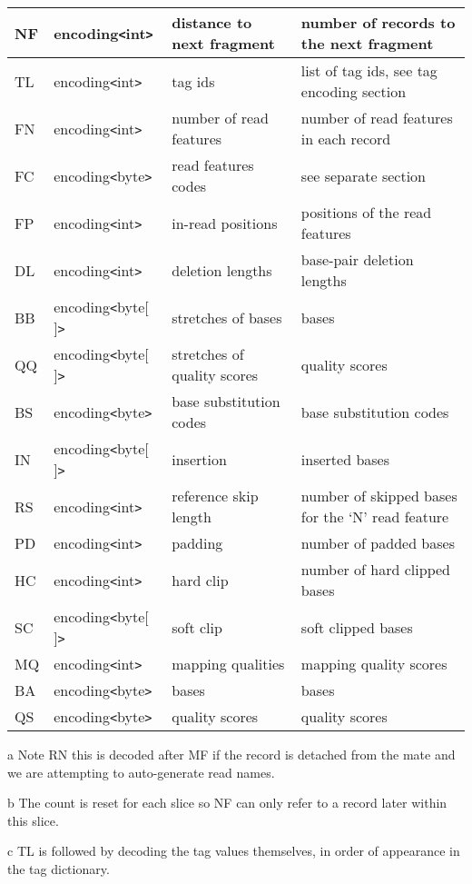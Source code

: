 \documentclass[a4paper]{article}
\begin{document}
\begin{threeparttable}[t]
\begin{tabular}{|l|l|>{\raggedright}p{100pt}|>{\raggedright}p{220pt}|}
\hline
NF & encoding\texttt{<}int\texttt{>} & distance to next fragment & number of records
to the next fragment\tnote{b}\tabularnewline
\hline
TL\tnote{c} & encoding\texttt{<}int\texttt{>} & tag ids  & list of tag ids, see tag encoding
section\tabularnewline
\hline
FN & encoding\texttt{<}int\texttt{>} & number of read features & number of read
features in each record\tabularnewline
\hline
FC & encoding\texttt{<}byte\texttt{>} & read features codes & see separate section\tabularnewline
\hline
FP & encoding\texttt{<}int\texttt{>} & in-read positions & positions of the read
features\tabularnewline
\hline
DL & encoding\texttt{<}int\texttt{>} & deletion lengths & base-pair deletion lengths\tabularnewline
\hline
BB & encoding\texttt{<}byte[ ]\texttt{>} & stretches of bases & bases\tabularnewline
\hline
QQ & encoding\texttt{<}byte[ ]\texttt{>} & stretches of quality scores & quality scores\tabularnewline
\hline
BS & encoding\texttt{<}byte\texttt{>} & base substitution codes & base substitution
codes\tabularnewline
\hline
IN & encoding\texttt{<}byte[ ]\texttt{>} & insertion & inserted bases\tabularnewline
\hline
RS & encoding\texttt{<}int\texttt{>} & reference skip length & number of skipped 
bases for the `N' read feature\tabularnewline
\hline
PD & encoding\texttt{<}int\texttt{>} & padding & number of padded bases\tabularnewline
\hline
HC & encoding\texttt{<}int\texttt{>} & hard clip & number of hard clipped bases\tabularnewline
\hline
SC & encoding\texttt{<}byte[ ]\texttt{>} & soft clip & soft clipped bases\tabularnewline
\hline
MQ & encoding\texttt{<}int\texttt{>} & mapping qualities & mapping quality scores\tabularnewline
\hline
BA & encoding\texttt{<}byte\texttt{>} & bases & bases\tabularnewline
\hline
QS & encoding\texttt{<}byte\texttt{>} & quality scores & quality scores\tabularnewline
\hline
\end{tabular}

\begin{tablenotes}
\item[a] Note RN this is decoded after MF if the record is detached from the mate and we are attempting to auto-generate read names.
\item[b] The count is reset for each slice so NF can only refer to a record later within this slice.
\item[c] TL is followed by decoding the tag values themselves, in order of appearance in the tag dictionary.
\end{tablenotes}
\end{threeparttable}
\end{document}
